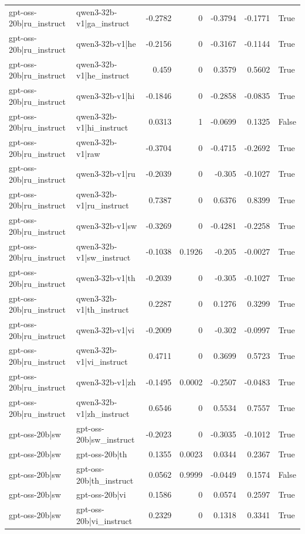 \begin{table}
\begin{tabular}{l l r r r r l}
gpt-oss-20b|ru_instruct & qwen3-32b-v1|ga_instruct & -0.2782 & 0 & -0.3794 & -0.1771 & True \\
gpt-oss-20b|ru_instruct & qwen3-32b-v1|he & -0.2156 & 0 & -0.3167 & -0.1144 & True \\
gpt-oss-20b|ru_instruct & qwen3-32b-v1|he_instruct & 0.459 & 0 & 0.3579 & 0.5602 & True \\
gpt-oss-20b|ru_instruct & qwen3-32b-v1|hi & -0.1846 & 0 & -0.2858 & -0.0835 & True \\
gpt-oss-20b|ru_instruct & qwen3-32b-v1|hi_instruct & 0.0313 & 1 & -0.0699 & 0.1325 & False \\
gpt-oss-20b|ru_instruct & qwen3-32b-v1|raw & -0.3704 & 0 & -0.4715 & -0.2692 & True \\
gpt-oss-20b|ru_instruct & qwen3-32b-v1|ru & -0.2039 & 0 & -0.305 & -0.1027 & True \\
gpt-oss-20b|ru_instruct & qwen3-32b-v1|ru_instruct & 0.7387 & 0 & 0.6376 & 0.8399 & True \\
gpt-oss-20b|ru_instruct & qwen3-32b-v1|sw & -0.3269 & 0 & -0.4281 & -0.2258 & True \\
gpt-oss-20b|ru_instruct & qwen3-32b-v1|sw_instruct & -0.1038 & 0.1926 & -0.205 & -0.0027 & True \\
gpt-oss-20b|ru_instruct & qwen3-32b-v1|th & -0.2039 & 0 & -0.305 & -0.1027 & True \\
gpt-oss-20b|ru_instruct & qwen3-32b-v1|th_instruct & 0.2287 & 0 & 0.1276 & 0.3299 & True \\
gpt-oss-20b|ru_instruct & qwen3-32b-v1|vi & -0.2009 & 0 & -0.302 & -0.0997 & True \\
gpt-oss-20b|ru_instruct & qwen3-32b-v1|vi_instruct & 0.4711 & 0 & 0.3699 & 0.5723 & True \\
gpt-oss-20b|ru_instruct & qwen3-32b-v1|zh & -0.1495 & 0.0002 & -0.2507 & -0.0483 & True \\
gpt-oss-20b|ru_instruct & qwen3-32b-v1|zh_instruct & 0.6546 & 0 & 0.5534 & 0.7557 & True \\
gpt-oss-20b|sw & gpt-oss-20b|sw_instruct & -0.2023 & 0 & -0.3035 & -0.1012 & True \\
gpt-oss-20b|sw & gpt-oss-20b|th & 0.1355 & 0.0023 & 0.0344 & 0.2367 & True \\
gpt-oss-20b|sw & gpt-oss-20b|th_instruct & 0.0562 & 0.9999 & -0.0449 & 0.1574 & False \\
gpt-oss-20b|sw & gpt-oss-20b|vi & 0.1586 & 0 & 0.0574 & 0.2597 & True \\
gpt-oss-20b|sw & gpt-oss-20b|vi_instruct & 0.2329 & 0 & 0.1318 & 0.3341 & True \\

\end{tabular}
\end{table}
